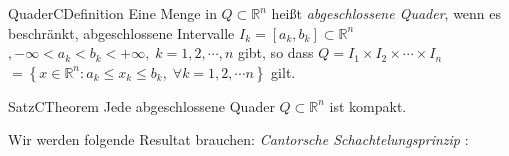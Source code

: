 \begin{ibox}[]{Quader}{CDefinition}
    Eine Menge in $ Q \subset \mathbb{R}^n  $ heißt \textit{abgeschlossene Quader}, wenn es 
	beschränkt, abgeschlossene Intervalle $ I_{k} = \left[ a_{k},b_{k} \right] \subset \mathbb{R}^n $ 
	$ , - \infty < a_{k} < b_{k}< + \infty , \; k = 1, 2, \cdots, n $ gibt, so dass   
	$ Q = I_{1} \times I_{2} \times \cdots \times I_{n} $ $ = \left\{ x \in \mathbb{R}^n : 
	a_{k} \leq  x_{k} \leq b_{k}, \; \forall  k = 1,2, \cdots n \right\}  $ gilt.
\end{ibox}

\begin{ibox}[23]{Satz}{CTheorem}
    Jede abgeschlossene Quader $ Q \subset  \mathbb{R}^n  $ ist kompakt.
\end{ibox}
Wir werden folgende Resultat brauchen: \textit{Cantorsche Schachtelungsprinzip} : 

